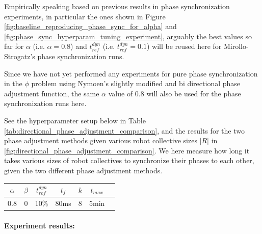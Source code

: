 		Empirically speaking based on previous results in phase synchronization experiments, in particular the ones shown in Figure \ref{fig:baseline_reproducing_phase_sync_for_alpha} and \ref{fig:phase_sync_hyperparam_tuning_experiment}, arguably the best values so far for $\alpha$ (i.e. $\alpha=0.8$) and $t_{ref}^{dyn}$ (i.e. $t_{ref}^{dyn}=0.1$) will be reused here for Mirollo-Strogatz's phase synchronization runs.
		
		Since we have not yet performed any experiments for pure phase synchronization in the $\phi$ problem using Nymoen's slightly modified and bi directional phase adjustment function, the same $\alpha$ value of 0.8 will also be used for the phase synchronization runs here.
		
		See the hyperparameter setup below in Table \ref{tab:directional_phase_adjustment_comparison}, and the results for the two phase adjustment methods given various robot collective sizes $|R|$ in \ref{fig:directional_phase_adjustment_comparison}. We here measure how long it takes various sizes of robot collectives to synchronize their phases to each other, given the two different phase adjustment methods.
		
		\begin{center}
		\begin{tabular}{ |c|c|c|c|c|c|c| } 
		\hline
		$\alpha$ & $\beta$ & $t_{ref}^{dyn}$ & $t_f$ & $k$ & $t_{max}$ \\
		\hline
		0.8 & 0 & 10\% & 80ms & 8 & 5min \\
		\hline
		\end{tabular}
		\label{tab:directional_phase_adjustment_comparison}
		\end{center}
		
		\paragraph{Experiment results:\nl}
		
